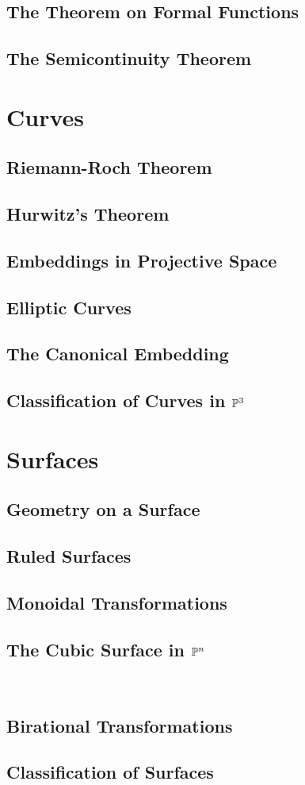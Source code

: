 \subsection{The Theorem on Formal Functions}
\subsection{The Semicontinuity Theorem}

\section{Curves}
\subsection{Riemann-Roch Theorem}
\subsection{Hurwitz's Theorem}
\subsection{Embeddings in Projective Space}
\subsection{Elliptic Curves}
\subsection{The Canonical Embedding}
\subsection{Classification of Curves in $\mathbb{P}^3$}

\section{Surfaces}
\subsection{Geometry on a Surface}
\subsection{Ruled Surfaces}
\subsection{Monoidal Transformations}
\subsection{The Cubic Surface in $\mathbb{P}^n$}\
\subsection{Birational Transformations}
\subsection{Classification of Surfaces}